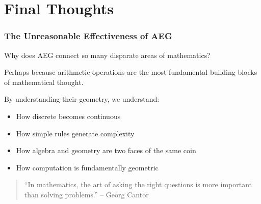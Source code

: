 \documentclass[aspectratio=169]{beamer}
\begin{document}

\section{Final Thoughts}

\begin{frame}
    \frametitle{The Unreasonable Effectiveness of AEG}
    Why does AEG connect so many disparate areas of mathematics?
    
    \vspace{0.5cm}
    
    \begin{center}
        \Large
        Perhaps because arithmetic operations are the most fundamental building blocks of mathematical thought.
    \end{center}
    
    \vspace{0.5cm}
    
    By understanding their geometry, we understand:
    \begin{itemize}
        \item How discrete becomes continuous
        \item How simple rules generate complexity
        \item How algebra and geometry are two faces of the same coin
        \item How computation is fundamentally geometric
    \end{itemize}
    
    \vspace{0.5cm}
    
    \begin{quote}
        ``In mathematics, the art of asking the right questions is more important than solving problems.'' -- Georg Cantor
    \end{quote}
\end{frame}
\end{document}
